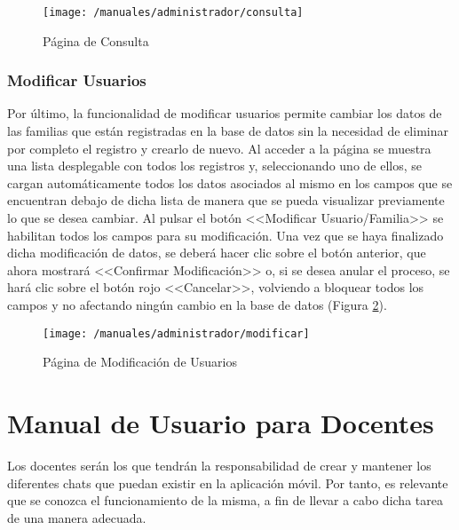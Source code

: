 \begin{figure}[!h]
	\begin{center}
		\texttt{[image: /manuales/administrador/consulta]}
		\caption{Página de Consulta}
		\label{fig:consultaweb}
	\end{center}
\end{figure}

\clearpage

\subsubsection*{Modificar Usuarios}
Por último, la funcionalidad de modificar usuarios permite cambiar los datos de las familias que están registradas en la base de datos sin la necesidad de eliminar por completo el registro y crearlo de nuevo. Al acceder a la página se muestra una lista desplegable con todos los registros y, seleccionando uno de ellos, se cargan automáticamente todos los datos asociados al mismo en los campos que se encuentran debajo de dicha lista de manera que se pueda visualizar previamente lo que se desea cambiar. Al pulsar el botón <<Modificar Usuario/Familia>> se habilitan todos los campos para su modificación. Una vez que se haya finalizado dicha modificación de datos, se deberá hacer clic sobre el botón anterior, que ahora mostrará <<Confirmar Modificación>> o, si se desea anular el proceso, se hará clic sobre el botón rojo <<Cancelar>>, volviendo a bloquear todos los campos y no afectando ningún cambio en la base de datos (Figura \ref{fig:modificarweb}).

\begin{figure}[!h]
	\begin{center}
		\texttt{[image: /manuales/administrador/modificar]}
		\caption{Página de Modificación de Usuarios}
		\label{fig:modificarweb}
	\end{center}
\end{figure}

\clearpage

\section*{Manual de Usuario para Docentes}
Los docentes serán los que tendrán la responsabilidad de crear y mantener los diferentes chats que puedan existir en la aplicación móvil. Por tanto, es relevante que se conozca el funcionamiento de la misma, a fin de llevar a cabo dicha tarea de una manera adecuada.

